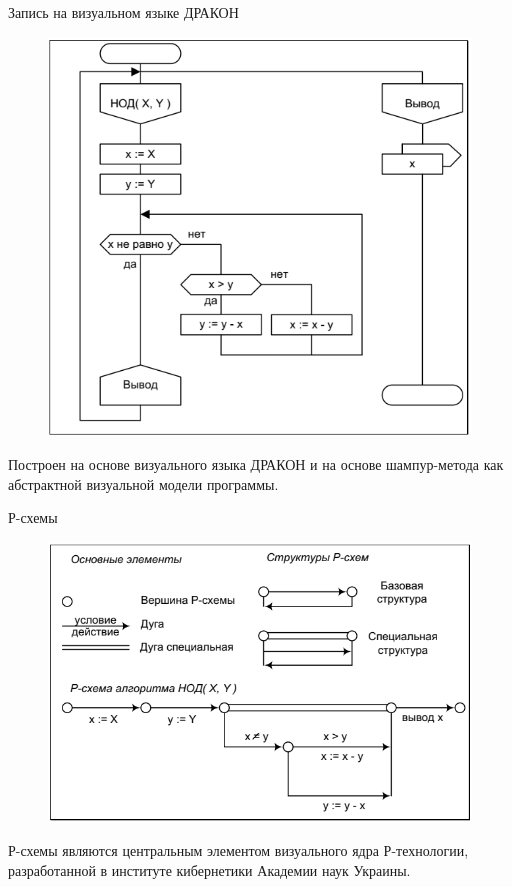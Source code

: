\documentclass{beamer}
\begin{document}
\begin{frame}
\begin{block}{Запись на визуальном языке ДРАКОН}
\begin{figure}[h]
\centering
\includegraphics[scale=0.4]{images/lec01-pic08.png}
\end{figure}
\end{block}
Построен на основе визуального языка ДРАКОН и на основе шампур-метода
как абстрактной визуальной модели программы.
\end{frame}

\begin{frame}
\begin{block}{Р-схемы}
\begin{figure}[h]
\centering
\includegraphics[scale=0.4]{images/lec01-pic09.png}
\end{figure}
\end{block}
Р-схемы являются центральным элементом визуального ядра Р-технологии, разработанной в институте кибернетики Академии наук Украины.
\end{frame}
\end{document}

